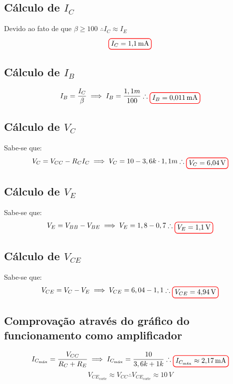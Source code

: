 \documentclass[12pt,openany,oneside,a4paper]{abntex2}
\begin{document}
\subsection{Cálculo de $I_{C}$}
Devido ao fato de que $\beta \geq 100$ $\therefore I_C \approx I_E$
\[
\tikz[baseline]{\node[draw=red, thick, rounded corners] {$I_{C} = 1{,}1\,\text{mA}$};}
\]

\subsection{Cálculo de $I_{B}$}
\[
I_{B} = \frac {I_{C}} \beta \implies I_{B} = \frac {1,1m} {100} \therefore \tikz[baseline]{\node[draw=red, thick, rounded corners] {$I_{B} = 0{,}011\,\text{mA}$};}
\]

\subsection{Cálculo de $V_{C}$}
Sabe-se que:
\[
V_{C} = V_{CC} - R_{C} I_{C} \implies V_{C} = 10 - 3,6k \cdot 1,1m \therefore \tikz[baseline]{\node[draw=red, thick, rounded corners] {$V_{C} = 6{,}04\,\text{V}$};}
\]

\subsection{Cálculo de $V_{E}$}
Sabe-se que:
\[
V_{E} = V_{BB} - V_{BE} \implies V_{E} = 1,8 - 0,7 \therefore \tikz[baseline]{\node[draw=red, thick, rounded corners] {$V_{E} = 1{,}1\,\text{V}$};}
\]

\subsection{Cálculo de $V_{CE}$}
Sabe-se que:
\[
V_{CE} = V_{C} - V_{E} \implies V_{CE} = 6,04 - 1,1 \therefore \tikz[baseline]{\node[draw=red, thick, rounded corners] {$V_{CE} = 4{,}94\,\text{V}$};}
\]

\subsection{Comprovação através do gráfico do funcionamento como amplificador}
\[
I_{C_{\text{máx}}} = \frac {V_{CC}}{R_{C} + R_{E}} \implies I_{C_{\text{máx}}} = \frac {10}{3,6k + 1k} \therefore \tikz[baseline]{\node[draw=red, thick, rounded corners] {$I_{C_{\text{máx}}} \approx 2{,}17\,\text{mA}$};}
\]
\[
V_{CE_{\text{corte}}} \approx V_{CC} \therefore V_{CE_{\text{corte}}} \approx 10\,V
\]
\end{document}
